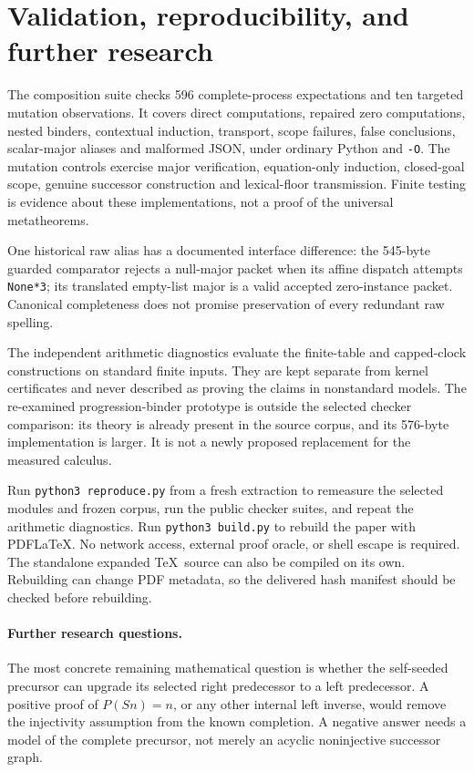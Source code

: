 \documentclass[11pt,letterpaper]{article}
\theoremstyle{definition}\newtheorem{definition}[theorem]{Definition}
\theoremstyle{remark}\newtheorem{remark}[theorem]{Remark}
\begin{document}
\section{Validation, reproducibility, and further research}
\label{sec:validation}

The composition suite checks 596 complete-process expectations and ten
targeted mutation observations. It covers direct computations, repaired
zero computations, nested binders, contextual induction, transport,
scope failures, false conclusions, scalar-major aliases and malformed
JSON, under ordinary Python and \texttt{-O}. The mutation controls exercise
major verification, equation-only induction, closed-goal scope, genuine
successor construction and lexical-floor transmission. Finite testing is
evidence about these implementations, not a proof of the universal
metatheorems.

One historical raw alias has a documented interface difference: the
545-byte guarded comparator rejects a null-major packet when its affine
dispatch attempts \texttt{None*3}; its translated empty-list major is a
valid accepted zero-instance packet. Canonical completeness does not
promise preservation of every redundant raw spelling.

The independent arithmetic diagnostics evaluate the finite-table and
capped-clock constructions on standard finite inputs. They are kept
separate from kernel certificates and never described as proving the
claims in nonstandard models. The re-examined progression-binder prototype
is outside the selected checker comparison: its theory is already present
in the source corpus, and its 576-byte implementation is larger. It is not
a newly proposed replacement for the measured calculus.

Run \texttt{python3 reproduce.py} from a fresh extraction to remeasure
the selected modules and frozen corpus, run the public checker suites,
and repeat the arithmetic diagnostics. Run \texttt{python3 build.py}
to rebuild the paper with PDFLaTeX. No network access, external proof
oracle, or shell escape is required. The standalone expanded \TeX\ source
can also be compiled on its own. Rebuilding can change PDF metadata, so
the delivered hash manifest should be checked before rebuilding.

\paragraph{Further research questions.}
The most concrete remaining mathematical question is whether the
self-seeded precursor can upgrade its selected right predecessor to a
left predecessor. A positive proof of $P(Sn)=n$, or any other internal
left inverse, would remove the injectivity assumption from the known
completion. A negative answer needs a model of the complete precursor,
not merely an acyclic noninjective successor graph.
\end{document}
